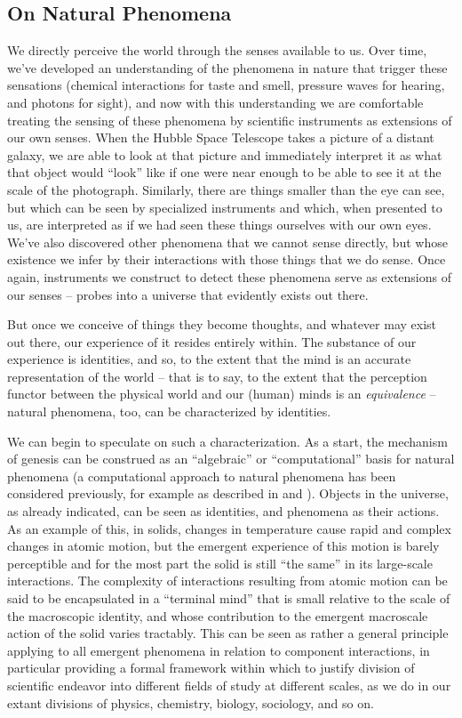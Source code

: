 \documentclass[pra,twocolumn,groupedaddress,10pt]{revtex4}
\theoremstyle{definition}
\begin{document}
\subsection{On Natural Phenomena} \label{sec:natphe}

We directly perceive the world through the senses available to us. Over time, we've developed an understanding of the phenomena in nature that trigger these sensations (chemical interactions for taste and smell, pressure waves for hearing, and photons for sight), and now with this understanding we are comfortable treating the sensing of these phenomena by scientific instruments as extensions of our own senses. When the Hubble Space Telescope takes a picture of a distant galaxy, we are able to look at that picture and immediately interpret it as what that object would ``look'' like if one were near enough to be able to see it at the scale of the photograph. Similarly, there are things smaller than the eye can see, but which can be seen by specialized instruments and which, when presented to us, are interpreted as if we had seen these things ourselves with our own eyes. We've also discovered other phenomena that we cannot sense directly, but whose existence we infer by their interactions with those things that we do sense. Once again, instruments we construct to detect these phenomena serve as extensions of our senses -- probes into a universe that evidently exists out there.

But once we conceive of things they become thoughts, and whatever may exist out there, our experience of it resides entirely within. The substance of our experience is identities, and so, to the extent that the mind is an accurate representation of the world -- that is to say, to the extent that the perception functor between the physical world and our (human) minds is an \textit{equivalence} -- natural phenomena, too, can be characterized by identities.

We can begin to speculate on such a characterization. As a start, the mechanism of genesis can be construed as an ``algebraic'' or ``computational'' basis for natural phenomena (a computational approach to natural phenomena has been considered previously, for example as described in \cite{greatideas} and \cite{wolfram}). Objects in the universe, as already indicated, can be seen as identities, and phenomena as their actions. As an example of this, in solids, changes in temperature cause rapid and complex changes in atomic motion, but the emergent experience of this motion is barely perceptible and for the most part the solid is still ``the same'' in its large-scale interactions. The complexity of interactions resulting from atomic motion can be said to be encapsulated in a ``terminal mind'' that is small relative to the scale of the macroscopic identity, and whose contribution to the emergent macroscale action of the solid varies tractably. This can be seen as rather a general principle applying to all emergent phenomena in relation to component interactions, in particular providing a formal framework within which to justify division of scientific endeavor into different fields of study at different scales, as we do in our extant divisions of physics, chemistry, biology, sociology, and so on.
\end{document}
